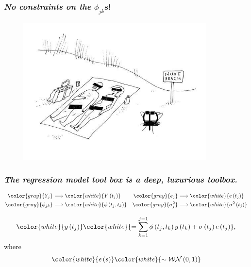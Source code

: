 \documentclass[12pt]{beamer}
\newcommand{\makegrey}[1]{{ \color{gray} {#1}}}
\newcommand{\makewhite}[1]{{ \color{white} {#1}}}
\newcommand\myfootnote[1]{%
  \begingroup
  \renewcommand\thefootnote{}\footnote{#1}%
  \addtocounter{footnote}{-1}%
  \endgroup
}
\begin{document}
\begin{frame}
\frametitle{\emph{No constraints on the} $\phi_{jk}$s!}

\begin{adjustwidth}{-3cm}{-3cm}
\begin{center}
\begin{figure}
\graphicspath{{img/}}
  \includegraphics[height=7.5cm]{nude-beach}
\end{figure}
\end{center}
  \end{adjustwidth}
\end{frame}





\begin{frame}
\frametitle{\emph{The regression model tool box is a deep, luxurious toolbox.}}

\begin{align*}
\makegrey{Y_j}  	&\longrightarrow \makewhite{Y\left( t_j \right) }		&	 \makegrey{e_j} 		&\longrightarrow \makewhite{e\left( t_j \right)}\\
\makegrey{\phi_{jk}} &\longrightarrow \makewhite{\phi\left(t_j,t_k\right)} 	& 	\makegrey{\sigma^2_{j}} &\longrightarrow \makewhite{\sigma^2\left(t_j\right)}
\end{align*}
\noindent


\begin{equation}  \label{eq:MyModel}  
\makewhite{y\left(t_j \right)}  \makewhite{= \sum_{k=1}^{j-1} \phi\left(t_j ,t_k\right) y\left(t_k\right) + \sigma\left(t_j\right)e\left({t_j}\right)},
\end{equation}
\noindent
where
\begin{equation*} 
\makewhite{e\left(s\right)} \makewhite{ \sim  \mathcal{WN}\left(0,1\right)}
\end{equation*}


\end{frame}
\end{document}
